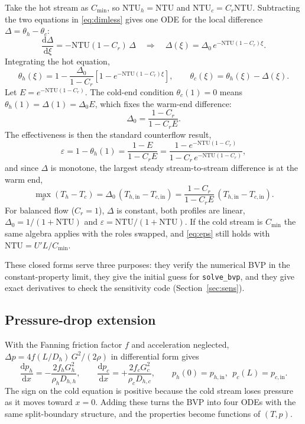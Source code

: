 \documentclass[11pt]{article}
\newcommand{\dd}{\mathrm{d}}
\newcommand{\NTU}{\mathrm{NTU}}
\newcommand{\hin}{_{h,\mathrm{in}}}
\newcommand{\cin}{_{c,\mathrm{in}}}
\begin{document}
Take the hot stream as $C_{\min}$, so $\NTU_h = \NTU$ and $\NTU_c = C_r\NTU$. Subtracting the two equations in \eqref{eq:dimless} gives one ODE for the local difference $\Delta = \theta_h - \theta_c$:
\begin{equation}
  \frac{\dd\Delta}{\dd\xi} = -\NTU(1 - C_r)\,\Delta
  \quad\Longrightarrow\quad
  \Delta(\xi) = \Delta_0\, e^{-\NTU(1-C_r)\xi}.
\end{equation}
Integrating the hot equation,
\begin{equation}
  \theta_h(\xi) = 1 - \frac{\Delta_0}{1 - C_r}\left[1 - e^{-\NTU(1-C_r)\xi}\right],
  \qquad
  \theta_c(\xi) = \theta_h(\xi) - \Delta(\xi).
  \label{eq:profiles}
\end{equation}
Let $E = e^{-\NTU(1-C_r)}$. The cold-end condition $\theta_c(1) = 0$ means $\theta_h(1) = \Delta(1) = \Delta_0 E$, which fixes the warm-end difference:
\begin{equation}
  \Delta_0 = \frac{1 - C_r}{1 - C_r E}.
\end{equation}
The effectiveness is then the standard counterflow result,
\begin{equation}
  \varepsilon = 1 - \theta_h(1) = \frac{1 - E}{1 - C_r E}
             = \frac{1 - e^{-\NTU(1-C_r)}}{1 - C_r\, e^{-\NTU(1-C_r)}},
  \label{eq:eps}
\end{equation}
and since $\Delta$ is monotone, the largest steady stream-to-stream difference is at the warm end,
\begin{equation}
  \max_x (T_h - T_c) = \Delta_0\,(T\hin - T\cin) = \frac{1 - C_r}{1 - C_r E}\,(T\hin - T\cin).
  \label{eq:dTmax}
\end{equation}
For balanced flow ($C_r = 1$), $\Delta$ is constant, both profiles are linear, $\Delta_0 = 1/(1+\NTU)$ and $\varepsilon = \NTU/(1+\NTU)$. If the cold stream is $C_{\min}$ the same algebra applies with the roles swapped, and \eqref{eq:eps} still holds with $\NTU = U'L/C_{\min}$.

These closed forms serve three purposes: they verify the numerical BVP in the constant-property limit, they give the initial guess for \texttt{solve\_bvp}, and they give exact derivatives to check the sensitivity code (Section~\ref{sec:sens}).

\subsection{Pressure-drop extension}
\label{sec:dp}

With the Fanning friction factor $f$ and acceleration neglected, $\Delta p = 4f(L/D_h)\,G^2/(2\rho)$ in differential form gives
\begin{equation}
  \frac{\dd p_h}{\dd x} = -\frac{2 f_h G_h^2}{\rho_h D_{h,h}},
  \qquad
  \frac{\dd p_c}{\dd x} = +\frac{2 f_c G_c^2}{\rho_c D_{h,c}},
  \qquad
  p_h(0) = p\hin,\ \ p_c(L) = p\cin .
\end{equation}
The sign on the cold equation is positive because the cold stream loses pressure as it moves toward $x = 0$. Adding these turns the BVP into four ODEs with the same split-boundary structure, and the properties become functions of $(T,p)$.
\end{document}
